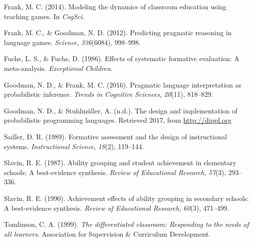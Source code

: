 \documentclass[man]{apa6}
\begin{document}
\hypertarget{ref-frank2014}{}
Frank, M. C. (2014). Modeling the dynamics of classroom education using
teaching games. In \emph{CogSci}.

\hypertarget{ref-frank2012}{}
Frank, M. C., \& Goodman, N. D. (2012). Predicting pragmatic reasoning
in language games. \emph{Science}, \emph{336}(6084), 998--998.

\hypertarget{ref-fuchs1986}{}
Fuchs, L. S., \& Fuchs, D. (1986). Effects of systematic formative
evaluation: A meta-analysis. \emph{Exceptional Children}.

\hypertarget{ref-goodman2016}{}
Goodman, N. D., \& Frank, M. C. (2016). Pragmatic language
interpretation as probabilistic inference. \emph{Trends in Cognitive
Sciences}, \emph{20}(11), 818--829.

\hypertarget{ref-goodman2017}{}
Goodman, N. D., \& Stuhlmüller, A. (n.d.). The design and implementation
of probabilistic programming languages. Retrieved 2017, from
\url{http://dippl.org}

\hypertarget{ref-sadler1989}{}
Sadler, D. R. (1989). Formative assessment and the design of
instructional systems. \emph{Instructional Science}, \emph{18}(2),
119--144.

\hypertarget{ref-slavin1987}{}
Slavin, R. E. (1987). Ability grouping and student achievement in
elementary schools: A best-evidence synthesis. \emph{Review of
Educational Research}, \emph{57}(3), 293--336.

\hypertarget{ref-slavin1990}{}
Slavin, R. E. (1990). Achievement effects of ability grouping in
secondary schools: A best-evidence synthesis. \emph{Review of
Educational Research}, \emph{60}(3), 471--499.

\hypertarget{ref-tomlinson1999}{}
Tomlinson, C. A. (1999). \emph{The differentiated classroom: Responding
to the needs of all learners}. Association for Supervision \& Curriculum
Development.


\end{document}
